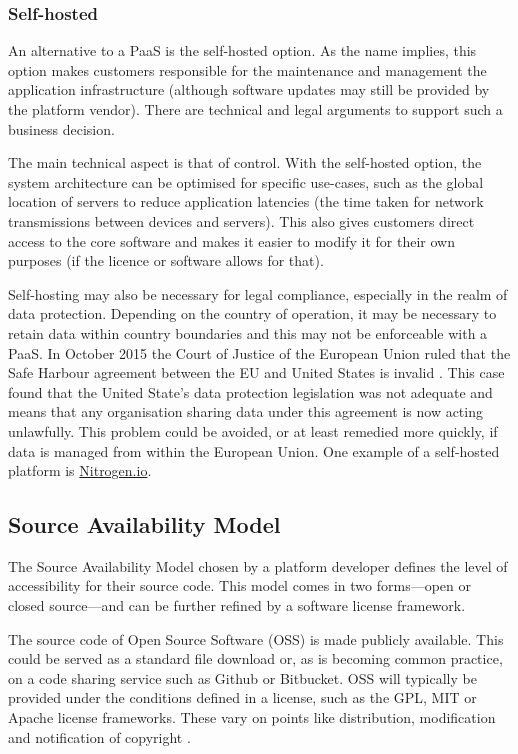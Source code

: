       \subsubsection{Self-hosted}
        An alternative to a PaaS is the self-hosted option. As the name implies, this option makes customers responsible for the maintenance and management the application infrastructure (although software updates may still be provided by the platform vendor). There are technical and legal arguments to support such a business decision.

        The main technical aspect is that of control. With the self-hosted option, the system architecture can be optimised for specific use-cases, such as the global location of servers to reduce application latencies (the time taken for network transmissions between devices and servers). This also gives customers direct access to the core software and makes it easier to modify it for their own purposes (if the licence or software allows for that).

        Self-hosting may also be necessary for legal compliance, especially in the realm of data protection. Depending on the country of operation, it may be necessary to retain data within country boundaries and this may not be enforceable with a PaaS. In October 2015 the Court of Justice of the European Union ruled that the Safe Harbour agreement between the EU and United States is invalid \citep{C362/14}. This case found that the United State's data protection legislation was not adequate and means that any organisation sharing data under this agreement is now acting unlawfully. This problem could be avoided, or at least remedied more quickly, if data is managed from within the European Union. One example of a self-hosted platform is \href{http://nitrogen.io/}{Nitrogen.io}.


    \subsection{Source Availability Model}
      The Source Availability Model chosen by a platform developer defines the level of accessibility for their source code. This model comes in two forms---open or closed source---and can be further refined by a software license framework.

      The source code of Open Source Software (OSS) is made publicly available. This could be served as a standard file download or, as is becoming common practice, on a code sharing service such as Github or Bitbucket. OSS will typically be provided under the conditions defined in a license, such as the GPL, MIT or Apache license frameworks. These vary on points like distribution, modification and notification of copyright \citep{license:2015}.

